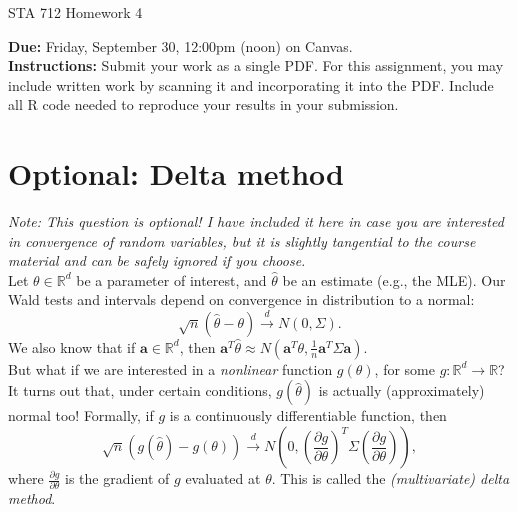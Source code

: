 \documentclass[11pt]{article}
\begin{document}
\begin{center}
\Large
STA 712 Homework 4\\
\normalsize
\vspace{5mm}
\end{center}

\noindent \textbf{Due:} Friday, September 30, 12:00pm (noon) on Canvas.\\ 

\noindent \textbf{Instructions:} Submit your work as a single PDF. For this assignment, you may include written work by scanning it and incorporating it into the PDF. Include all R code needed to reproduce your results in your submission.

\section*{Optional: Delta method}

\textit{Note: This question is optional! I have included it here in case you are interested in convergence of random variables, but it is slightly tangential to the course material and can be safely ignored if you choose.}\\

\noindent Let $\theta \in \mathbb{R}^d$ be a parameter of interest, and $\widehat{\theta}$ be an estimate (e.g., the MLE). Our Wald tests and intervals depend on convergence in distribution to a normal:
$$\sqrt{n}(\widehat{\theta} - \theta) \overset{d}{\to} N(0, \Sigma).$$
We also know that if $\bm{a} \in \mathbb{R}^d$, then $\bm{a}^T \widehat{\theta} \approx N(\bm{a}^T \theta, \frac{1}{n} \bm{a}^T \Sigma \bm{a})$.\\

\noindent But what if we are interested in a \textit{nonlinear} function $g(\theta)$, for some $g: \mathbb{R}^d \to \mathbb{R}$? It turns out that, under certain conditions, $g(\widehat{\theta})$ is actually (approximately) normal too! Formally, if $g$ is a continuously differentiable function, then
$$\sqrt{n}(g(\widehat{\theta}) - g(\theta)) \overset{d}{\to} N\left(0, \left( \frac{\partial g}{\partial \theta} \right)^T \Sigma \left( \frac{\partial g}{\partial \theta} \right) \right),$$
where $\frac{\partial g}{\partial \theta}$ is the gradient of $g$ evaluated at $\theta$. This is called the \textit{(multivariate) delta method}.\\
\end{document}

